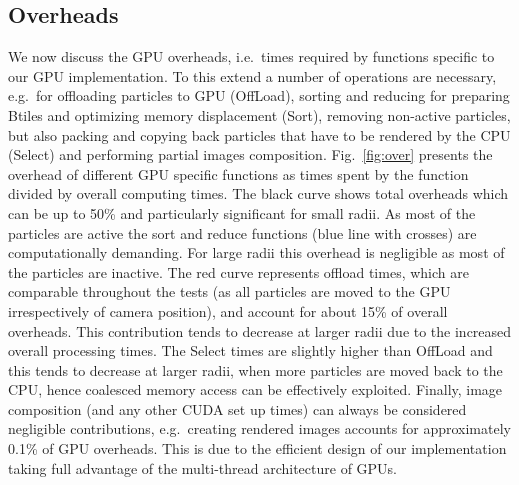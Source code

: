 \documentclass[smallextended]{svjour3}
\begin{document}
\subsection{Overheads}
\label{sec:overhead}
We now discuss the GPU overheads, i.e.\ times required by functions specific to our GPU implementation. To this extend a number of operations are necessary, e.g.\ for offloading particles to GPU (OffLoad), sorting and reducing for preparing Btiles and optimizing memory displacement (Sort), removing non-active particles, but also packing and copying back particles that have to be rendered by the CPU (Select) and performing partial images composition. Fig.~\ref{fig:over} presents the overhead of different GPU specific functions as times spent by the function divided by overall computing times. The black curve shows total overheads which can be up to 50\% and particularly significant for small radii. As most of the particles are active the sort and reduce
functions (blue line with crosses) are computationally demanding. For large radii this overhead is negligible as most of the particles are inactive. 
The red curve represents offload times, which are comparable throughout the tests (as all particles are moved to the GPU irrespectively of camera position), and account for about 15\% of overall overheads. This contribution tends to decrease at larger radii due to the increased overall processing times. The Select times are slightly higher than OffLoad and this tends to decrease at larger radii, when more particles are moved back to the CPU, hence coalesced memory access can be effectively exploited. Finally, image composition (and any other CUDA set up times) can always be considered negligible contributions, e.g.\ creating rendered images accounts for approximately 0.1\% of GPU overheads. This is due to the efficient design of our implementation taking full advantage of the multi-thread architecture of GPUs.
\end{document}
